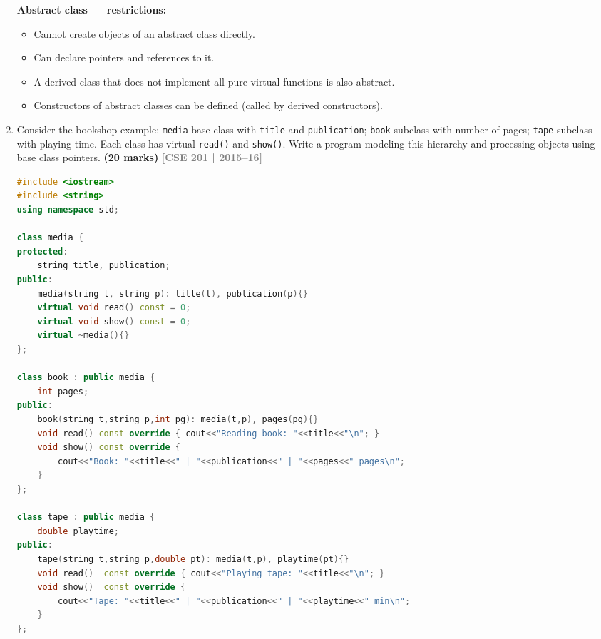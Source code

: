 \documentclass[12pt,a3paper]{article}
\newcommand{\yr}[1]{\hfill\textcolor{gray}{\small\textbf{[#1]}}}
\newcommand{\mk}[1]{\textcolor{orange!70!black}{\small\textbf{(#1 marks)}}}
\begin{document}
\begin{enumerate}
\begin{tcolorbox}
\textbf{Abstract class --- restrictions:}
\begin{itemize}[itemsep=2pt]
  \item Cannot create objects of an abstract class directly.
  \item Can declare pointers and references to it.
  \item A derived class that does not implement all pure virtual
    functions is also abstract.
  \item Constructors of abstract classes can be defined (called by
    derived constructors).
\end{itemize}

\end{tcolorbox}


\item Consider the bookshop example: \texttt{media} base class with \texttt{title} and \texttt{publication}; \texttt{book} subclass with number of pages; \texttt{tape} subclass with playing time. Each class has virtual \texttt{read()} and \texttt{show()}. Write a program modeling this hierarchy and processing objects using base class pointers. \mk{20}
\yr{CSE 201 | 2015--16}
\begin{tcolorbox}[enhanced,breakable,ansbox,colback=cG!4,colframe=cG,
  boxrule=0.8pt,arc=5pt,
  title={\textbf{Answer --- Bookshop hierarchy --- media, book, tape with virtual functions}},
  fonttitle=\bfseries\color{white},colbacktitle=cG]

\begin{lstlisting}[language=C++]
#include <iostream>
#include <string>
using namespace std;

class media {
protected:
    string title, publication;
public:
    media(string t, string p): title(t), publication(p){}
    virtual void read() const = 0;
    virtual void show() const = 0;
    virtual ~media(){}
};

class book : public media {
    int pages;
public:
    book(string t,string p,int pg): media(t,p), pages(pg){}
    void read() const override { cout<<"Reading book: "<<title<<"\n"; }
    void show() const override {
        cout<<"Book: "<<title<<" | "<<publication<<" | "<<pages<<" pages\n";
    }
};

class tape : public media {
    double playtime;
public:
    tape(string t,string p,double pt): media(t,p), playtime(pt){}
    void read()  const override { cout<<"Playing tape: "<<title<<"\n"; }
    void show()  const override {
        cout<<"Tape: "<<title<<" | "<<publication<<" | "<<playtime<<" min\n";
    }
};


\end{lstlisting}
\end{tcolorbox}
\end{enumerate}
\end{document}
